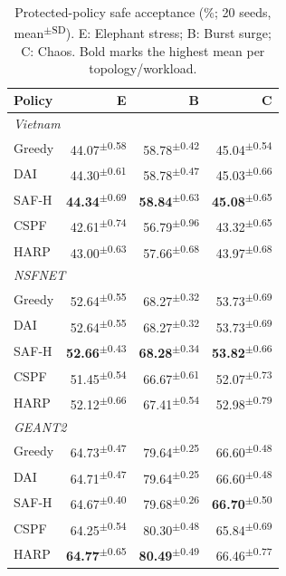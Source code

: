 \documentclass[final,5p]{elsarticle}
\newcommand{\rev}[1]{\textcolor{revisiongreen}{#1}}
\let\newrev\rev
\begin{document}
\begin{table}[t]
\centering
\caption{\newrev{Protected-policy safe acceptance (\%; 20 seeds, mean\textsuperscript{$\pm$SD}). E: Elephant stress; B: Burst surge; C: Chaos. Bold marks the highest mean per topology/workload.}}
\label{tab:simulation_acceptance_summary}
{\color{revisiongreen}\footnotesize
\setlength{\tabcolsep}{4pt}
\begin{tabular}{lrrr}
\toprule
Policy & E & B & C \\
\midrule
\multicolumn{4}{l}{\textit{Vietnam}} \\
Greedy & 44.07\textsuperscript{$\pm$0.58} & 58.78\textsuperscript{$\pm$0.42} & 45.04\textsuperscript{$\pm$0.54} \\
DAI & 44.30\textsuperscript{$\pm$0.61} & 58.78\textsuperscript{$\pm$0.47} & 45.03\textsuperscript{$\pm$0.66} \\
SAF-H & \textbf{44.34}\textsuperscript{$\pm$0.69} & \textbf{58.84}\textsuperscript{$\pm$0.63} & \textbf{45.08}\textsuperscript{$\pm$0.65} \\
CSPF & 42.61\textsuperscript{$\pm$0.74} & 56.79\textsuperscript{$\pm$0.96} & 43.32\textsuperscript{$\pm$0.65} \\
HARP & 43.00\textsuperscript{$\pm$0.63} & 57.66\textsuperscript{$\pm$0.68} & 43.97\textsuperscript{$\pm$0.68} \\
\multicolumn{4}{l}{\textit{NSFNET}} \\
Greedy & 52.64\textsuperscript{$\pm$0.55} & 68.27\textsuperscript{$\pm$0.32} & 53.73\textsuperscript{$\pm$0.69} \\
DAI & 52.64\textsuperscript{$\pm$0.55} & 68.27\textsuperscript{$\pm$0.32} & 53.73\textsuperscript{$\pm$0.69} \\
SAF-H & \textbf{52.66}\textsuperscript{$\pm$0.43} & \textbf{68.28}\textsuperscript{$\pm$0.34} & \textbf{53.82}\textsuperscript{$\pm$0.66} \\
CSPF & 51.45\textsuperscript{$\pm$0.54} & 66.67\textsuperscript{$\pm$0.61} & 52.07\textsuperscript{$\pm$0.73} \\
HARP & 52.12\textsuperscript{$\pm$0.66} & 67.41\textsuperscript{$\pm$0.54} & 52.98\textsuperscript{$\pm$0.79} \\
\multicolumn{4}{l}{\textit{GEANT2}} \\
Greedy & 64.73\textsuperscript{$\pm$0.47} & 79.64\textsuperscript{$\pm$0.25} & 66.60\textsuperscript{$\pm$0.48} \\
DAI & 64.71\textsuperscript{$\pm$0.47} & 79.64\textsuperscript{$\pm$0.25} & 66.60\textsuperscript{$\pm$0.48} \\
SAF-H & 64.67\textsuperscript{$\pm$0.40} & 79.68\textsuperscript{$\pm$0.26} & \textbf{66.70}\textsuperscript{$\pm$0.50} \\
CSPF & 64.25\textsuperscript{$\pm$0.54} & 80.30\textsuperscript{$\pm$0.48} & 65.84\textsuperscript{$\pm$0.69} \\
HARP & \textbf{64.77}\textsuperscript{$\pm$0.65} & \textbf{80.49}\textsuperscript{$\pm$0.49} & 66.46\textsuperscript{$\pm$0.77} \\
\bottomrule
\end{tabular}}
\end{table}
\end{document}
